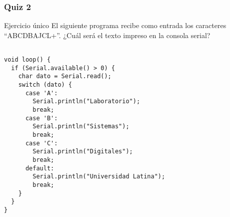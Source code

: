 \documentclass{beamer}
\begin{document}
\begin{frame}[fragile=singleslide]\frametitle{Quiz 2}

\begin{block}{Ejercicio único}
El siguiente programa recibe como entrada los caracteres ``ABCDBAJCL+''. ¿Cuál será el texto impreso en la consola serial?
\end{block}
\begin{scriptsize}
\begin{verbatim}

void loop() {
  if (Serial.available() > 0) {
    char dato = Serial.read();
    switch (dato) {
      case 'A':
        Serial.println("Laboratorio");
        break;
      case 'B':
        Serial.println("Sistemas");
        break;
      case 'C':
        Serial.println("Digitales");
        break;
      default:
        Serial.println("Universidad Latina");
        break;
    }
  }  
}

\end{verbatim}
\end{scriptsize}

\end{frame}
\end{document}
